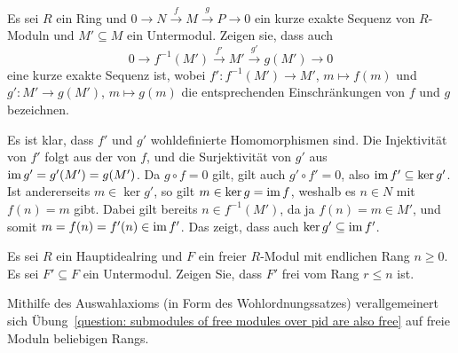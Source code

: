 \begin{question}
  \label{question: restriction of a short exact sequence to a submodule of its middle term}
  Es sei $R$ ein Ring und $0 \to N \xrightarrow{f} M \xrightarrow{g} P \to 0$ ein kurze exakte Sequenz von $R$-Moduln und $M' \subseteq M$ ein Untermodul.
  Zeigen sie, dass auch
  \[
    0 \to f^{-1}(M') \xrightarrow{f'} M' \xrightarrow{g'} g(M') \to 0
  \]
  eine kurze exakte Sequenz ist, wobei $f' \colon f^{-1}(M') \to M'$, $m \mapsto f(m)$ und $g' \colon M' \to g(M')$, $m \mapsto g(m)$ die entsprechenden Einschränkungen von $f$ und $g$ bezeichnen.
\end{question}


\begin{solution}
  Es ist klar, dass $f'$ und $g'$ wohldefinierte Homomorphismen sind.
  Die Injektivität von $f'$ folgt aus der von $f$, und die Surjektivität von $g'$ aus $\operatorname{im} g' = g'(M') = g(M')$.
  Da $g \circ f = 0$ gilt, gilt auch $g' \circ f' = 0$, also $\operatorname{im} f' \subseteq \ker g'$.
  Ist andererseits $m \in \ker g'$, so gilt $m \in \ker g = \operatorname{im} f$, weshalb es $n \in N$ mit $f(n) = m$ gibt.
  Dabei gilt bereits $n \in f^{-1}(M')$, da ja $f(n) = m \in M'$, und somit $m = f(n) = f'(n) \in \operatorname{im} f'$.
  Das zeigt, dass auch $\ker g' \subseteq \operatorname{im} f'$.
\end{solution}


\begin{question}
  \label{question: submodules of free modules over pid are also free}
  Es sei $R$ ein Hauptidealring und $F$ ein freier $R$-Modul mit endlichen Rang $n \geq 0$.
  Es sei $F' \subseteq F$ ein Untermodul.
  Zeigen Sie, dass $F'$ frei vom Rang $r \leq n$ ist.
\end{question}


\begin{remark*}
  Mithilfe des Auswahlaxioms (in Form des Wohlordnungssatzes) verallgemeinert sich Übung~\ref{question: submodules of free modules over pid are also free} auf freie Moduln beliebigen Rangs.
\end{remark*}


